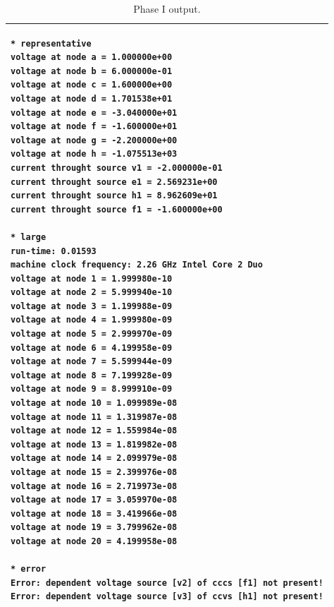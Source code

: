 \documentclass[12pt]{article}
\begin{document}
\begin{table}[h]
  \centering
\begin{tabular}{|p{\linewidth}|}
\hline
\scriptsize
\begin{verbatim}
* representative
voltage at node a = 1.000000e+00
voltage at node b = 6.000000e-01
voltage at node c = 1.600000e+00
voltage at node d = 1.701538e+01
voltage at node e = -3.040000e+01
voltage at node f = -1.600000e+01
voltage at node g = -2.200000e+00
voltage at node h = -1.075513e+03
current throught source v1 = -2.000000e-01
current throught source e1 = 2.569231e+00
current throught source h1 = 8.962609e+01
current throught source f1 = -1.600000e+00

* large
run-time: 0.01593
machine clock frequency: 2.26 GHz Intel Core 2 Duo
voltage at node 1 = 1.999980e-10
voltage at node 2 = 5.999940e-10
voltage at node 3 = 1.199988e-09
voltage at node 4 = 1.999980e-09
voltage at node 5 = 2.999970e-09
voltage at node 6 = 4.199958e-09
voltage at node 7 = 5.599944e-09
voltage at node 8 = 7.199928e-09
voltage at node 9 = 8.999910e-09
voltage at node 10 = 1.099989e-08
voltage at node 11 = 1.319987e-08
voltage at node 12 = 1.559984e-08
voltage at node 13 = 1.819982e-08
voltage at node 14 = 2.099979e-08
voltage at node 15 = 2.399976e-08
voltage at node 16 = 2.719973e-08
voltage at node 17 = 3.059970e-08
voltage at node 18 = 3.419966e-08
voltage at node 19 = 3.799962e-08
voltage at node 20 = 4.199958e-08

* error
Error: dependent voltage source [v2] of cccs [f1] not present!
Error: dependent voltage source [v3] of ccvs [h1] not present!
\end{verbatim}\\
\hline
\end{tabular}
  \caption{Phase I output.}
  \label{tab:phase1}
\end{table}
\end{document}
